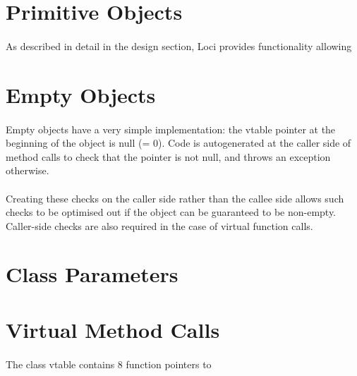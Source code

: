 \documentclass[12pt,twoside,notitlepage]{report}
\begin{document}
\section{Primitive Objects}

\paragraph{}
As described in detail in the design section, Loci provides functionality allowing 

\section{Empty Objects}

\paragraph{}
Empty objects have a very simple implementation: the vtable pointer at the beginning of the object is null (= 0). Code is autogenerated at the caller side of method calls to check that the pointer is not null, and throws an exception otherwise.

\paragraph{}
Creating these checks on the caller side rather than the callee side allows such checks to be optimised out if the object can be guaranteed to be non-empty. Caller-side checks are also required in the case of virtual function calls.

\section{Class Parameters}

\paragraph{}


\section{Virtual Method Calls}

\paragraph{}
The class vtable contains 8 function pointers to 

\cleardoublepage
\end{document}
